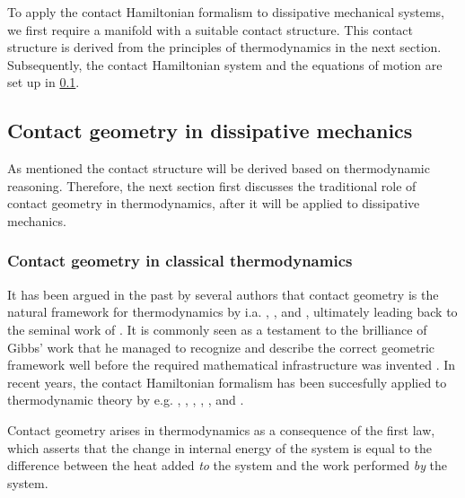 To apply the contact Hamiltonian formalism to dissipative mechanical systems, we first require a manifold with a suitable contact structure. This contact structure is derived from the principles of thermodynamics in the next section. Subsequently, the contact Hamiltonian system and the equations of motion are set up in \cref{ssec:contact_dissipation}.


\subsection{Contact geometry in dissipative mechanics}
\label{ssec:contact_dissipation}
As mentioned the contact structure will be derived based on thermodynamic reasoning. Therefore, the next section first discusses the traditional role of contact geometry in thermodynamics, after it will be applied to dissipative mechanics.

\subsubsection{Contact geometry in classical thermodynamics}
It has been argued in the past by several authors that contact geometry is the natural framework for thermodynamics by i.a. \citet{Arnold1991,Arnold1989a,Arnold1989,Arnold1989b}, \citet{Bamberg1988}, \citet{Burke1985} and \citet{Hermann1973}, ultimately leading back to the seminal work of \citet{Gibbs1873}. It is commonly seen as a testament to the brilliance of Gibbs' work that he managed to recognize and describe the correct geometric framework well before the required mathematical infrastructure was invented \cite{Wightman1979}. In recent years, the contact Hamiltonian formalism has been succesfully applied to thermodynamic theory by e.g. \citet{Mrugala1991,Mrugala2000,Mrugala1984,Mrugala1985,Mrugala1993,Mrugala1996}, \citet{Balian2001}, \citet{VanderSchaft2021a,VanderSchaft2018}, \citet{Maschke2018}, \citet{Bravetti2015}, and \citet{Simoes2020}. 

Contact geometry arises in thermodynamics as a consequence of the first law, which asserts that the change in internal energy of the system is equal to the difference between the heat added \emph{to} the system and the work performed \emph{by} the system. 

